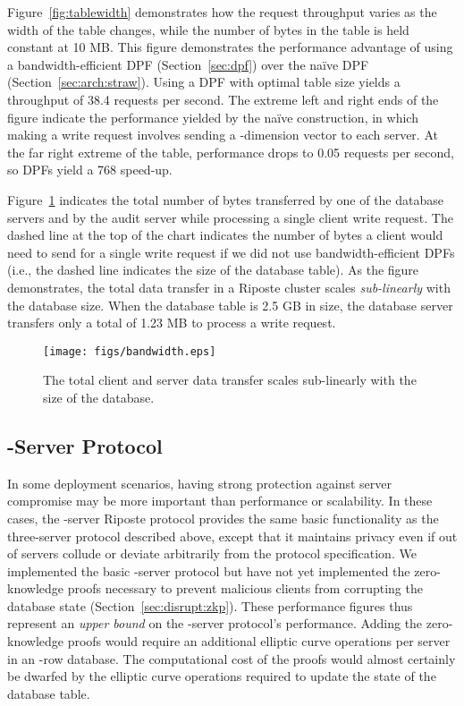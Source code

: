 \documentclass[10pt,twocolumn]{article}
\newcommand{\name}{Riposte\xspace}
\begin{document}
Figure~\ref{fig:tablewidth} demonstrates how the request throughput
varies as the width of the table changes, while the number
of bytes in the table is held constant at 10 MB.
This figure demonstrates the performance advantage of using
a bandwidth-efficient  DPF (Section~\ref{sec:dpf})
over the na\"ive DPF (Section~\ref{sec:arch:straw}).
Using a DPF with optimal table size yields a throughput of 38.4 requests
per second.
The extreme left and right ends of the figure indicate the performance
yielded by the na\"ive construction, in which making a write request
involves sending a -dimension vector to each server.
At the far right extreme of the table, performance drops to 
0.05 requests per second, so DPFs yield a 768 speed-up.

Figure~\ref{fig:bandwidth} indicates the total number of
bytes transferred by one of the database servers and
by the audit server while processing a single client write
request.
The dashed line at the top of the chart indicates the number
of bytes a client would need to send for a single write request
 if we did not use bandwidth-efficient DPFs
(i.e., the dashed line indicates the size of the database table).
As the figure demonstrates,
the total data transfer in a \name cluster
scales {\em sub-linearly} with the database size. 
When the database table is 2.5 GB in size, the database server
transfers only a total of 1.23 MB to process a write request.


\begin{figure}
\centering
\texttt{[image: figs/bandwidth.eps]}
\caption{The total client and server data 
  transfer scales sub-linearly
  with the size of the database.}
\label{fig:bandwidth}
\end{figure}


\subsection{-Server Protocol}

In some deployment scenarios, 
having strong protection against
server compromise may be more important
than performance or scalability.
In these cases, the -server \name protocol 
provides the same basic functionality as the three-server
protocol described above, except that it maintains
privacy even if  out of  servers collude or
deviate arbitrarily from the protocol specification.
We implemented the basic -server protocol but have not
yet implemented the zero-knowledge proofs necessary
to prevent malicious clients from corrupting the
database state (Section~\ref{sec:disrupt:zkp}).
These performance figures thus represent an {\em upper bound}
on the -server protocol's performance.
Adding the zero-knowledge proofs 
would require an additional 
elliptic curve operations per server in an -row database.
The computational cost of the proofs would almost certainly be dwarfed by the 
elliptic curve operations required to update the state of the database table.
\end{document}
